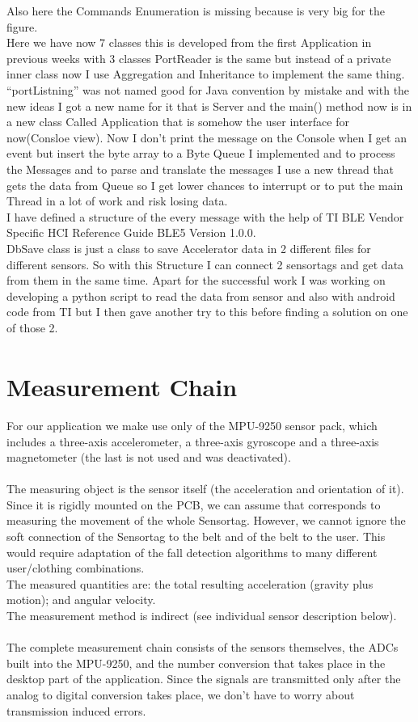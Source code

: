 \documentclass[conference,12pt]{IEEETran}
\begin{document}
Also here the Commands Enumeration is missing because is very big for the figure.\\
Here we have now 7 classes this is developed from the first Application in previous weeks with 3 classes PortReader is the same but instead of a private inner class now I use Aggregation and Inheritance to implement the same thing. “portListning” was not named good for Java convention by mistake and with the new ideas I got a new name for it that is Server and the main() method now is in a new class Called Application that is somehow the user interface for now(Consloe view).
Now I don’t print the message on the Console when I get an event but insert the byte array to a Byte Queue I implemented and to process the Messages and to parse and translate the messages I use a new thread that gets the data from Queue so I get lower chances to interrupt or to put the main Thread  in a lot of work and risk losing data.\\
I have defined a structure of the every message with the help of TI BLE Vendor Specific HCI Reference Guide BLE5 Version 1.0.0.\\
DbSave class is just a class to save Accelerator data in 2 different files for different sensors.
So with this Structure I can connect 2 sensortags and get data from them in the same time.
Apart for the successful work I was working on developing a python script to read the data from sensor and also with android code from TI but I then gave another try to this before finding a solution on one of those 2.\\

\section{Measurement Chain\textsuperscript{\cite{prodspec}}}
For our application we make use only of the MPU-9250 sensor pack, which includes a three-axis accelerometer, a three-axis gyroscope and a three-axis magnetometer (the last is not used and was deactivated).\\\\
The measuring object is the sensor itself (the acceleration and orientation of it). Since it is rigidly mounted on the PCB, we can assume that corresponds to measuring the movement of the whole Sensortag. However, we cannot ignore the soft connection of the Sensortag to the belt and of the belt to the user. This would require adaptation of the fall detection algorithms to many different user/clothing combinations.\\
The measured quantities are: the total resulting acceleration (gravity plus motion); and angular velocity.\\
The measurement method is indirect (see individual sensor description below).\\\\
The complete measurement chain consists of the sensors themselves, the ADCs built into the MPU-9250, and the number conversion that takes place in the desktop part of the application. Since the signals are transmitted only after the analog to digital conversion takes place, we don’t have to worry about transmission induced errors.
\end{document}
